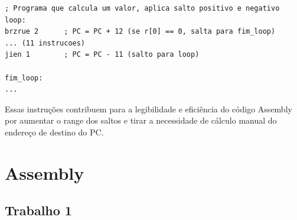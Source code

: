 \documentclass[12pt]{article}
\begin{document}
\begin{lstlisting}
; Programa que calcula um valor, aplica salto positivo e negativo
loop:
brzrue 2      ; PC = PC + 12 (se r[0] == 0, salta para fim_loop)
... (11 instrucoes)
jien 1        ; PC = PC - 11 (salto para loop)

fim_loop:
...
\end{lstlisting}

Essas instruções contribuem para a legibilidade e eficiência do código Assembly por aumentar o range dos saltos e tirar a necessidade de cálculo manual do endereço de destino do PC.

\section{Assembly}

\subsection{Trabalho 1}
\end{document}
